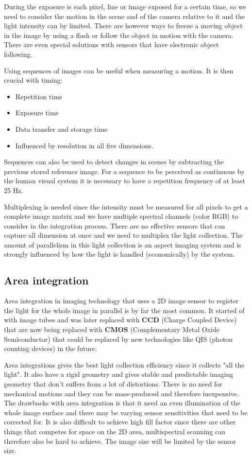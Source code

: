 During the exposure is each pixel, line or image exposed for a certain time, so we need to consider the motion in the scene and of the camera relative to it and the light intensity can by limited. There are however ways to freeze a moving object in the image by using a flash or follow the object in motion with the camera. There are even special solutions with sensors that have electronic object following. 

Using sequences of images can be useful when measuring a motion. It is then crucial with timing:
\begin{itemize}
 	\item Repetition time
 	\item Exposure time
 	\item Data transfer and storage time
 	\item Influenced by resolution in all five dimensions. 
 \end{itemize} 
Sequences can also be used to detect changes in scenes by subtracting the previous stored reference image. For a sequence to be perceived as continuous by the human visual system it is necessary to have a repetition frequency of at least 25 Hz.

Multiplexing is needed since the intensity must be measured for all pixels to get a complete image matrix and we have multiple spectral channels (color RGB) to consider in the integration process. There are no effective sensors that can capture all dimension at once and we need to multiplex the light collection. The amount of parallelism in this light collection is an aspect imaging system and is strongly influenced by how the light is handled (economically) by the system. 

\subsection*{Area integration}
Area integration in imaging technology that uses a 2D image sensor to register the light for the whole image in parallel is by far the most common. It started of with image tubes and was later replaced with \textbf{CCD} (Charge Coupled Device) that are now being replaced with \textbf{CMOS} (Complementary Metal Oxide Semiconductor) that could be replaced by new technologies like QIS (photon counting devices) in the future. 

Area integrations gives the best light collection efficiency since it collects "all the light". It also have a rigid geometry and gives stable and predictable imaging geometry that don't suffers from a lot of distortions. There is no need for mechanical motions and they can be mass-produced and therefore inexpensive. The drawbacks with area integration is that it need an even illumination of the whole image surface and there may be varying sensor sensitivities that need to be corrected for. It is also difficult to achieve high fill factor since there are other things that competes for space on the 2D area, multispectral scanning can therefore also be hard to achieve. The image size will be limited by the sensor size. 

